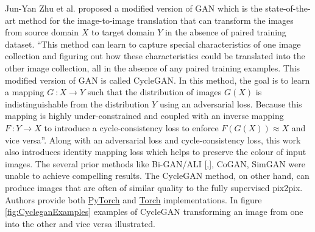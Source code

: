 Jun-Yan Zhu et al.\cite{zhu2020unpaired} proposed a modified version of \ac{GAN} which is the state-of-the-art method for the image-to-image translation that can transform the images from source domain $X$ to target domain $Y$ in the absence of paired training dataset. ``This method can learn to capture special characteristics of one image collection and figuring out how these characteristics could be translated into the other image collection, all in the absence of any paired training examples. This modified version of \ac{GAN} is called \ac{CycleGAN}. In this method, the goal is to learn a mapping $G\ \colon X \rightarrow Y$ such that the distribution of images $G(X)$ is indistinguishable from the distribution $Y$ using an adversarial loss. Because this mapping is highly under-constrained and coupled with an inverse mapping $F\ \colon Y \rightarrow X$ to introduce a cycle-consistency loss to enforce $F(G(X))\approx X$ and vice versa''\cite{zhu2020unpaired}. Along with an adversarial loss and cycle-consistency loss, this work also introduces identity mapping loss which helps to preserve the colour of input images. The several prior methods like Bi-GAN/ALI [\cite{donahue2017adversarial},\cite{dumoulin2017adversarially}], CoGAN\cite{liu2016coupled}, SimGAN\cite{shrivastava2017learning} were unable to achieve compelling results. The \ac{CycleGAN} method, on other hand, can produce images that are often of similar quality to the fully supervised pix2pix\cite{isola2018imagetoimage}. Authors provide both \href{https://github.com/junyanz/pytorch-CycleGAN-and-pix2pix}{PyTorch} and \href{https://github.com/junyanz/CycleGAN}{Torch} implementations. In figure \ref{fig:CycleganExamples} examples of \ac{CycleGAN} transforming an image from one into the other and vice versa illustrated.



